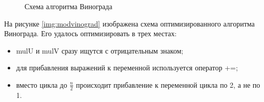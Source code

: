 \documentclass[a4paper,12pt]{article}
\begin{document}
\begin{figure}[H]
    \caption{Схема алгоритма Винограда}
    \label{img:vinograd}
\end{figure}

На рисунке \ref{img:modvinograd} изображена схема
оптимизированного алгоритма Винограда. Его удалось оптимизировать в трех местах:

\begin{itemize}
    \item {\ttfamily mulU} и {\ttfamily mulV} сразу ищутся с отрицательным знаком;
    \item для прибавления выражений к переменной используется оператор {\ttfamily +=};
    \item вместо цикла до $\frac{n}{2}$ происходит прибавление к переменной цикла
        по 2, а не по 1.
\end{itemize}
\end{document}

